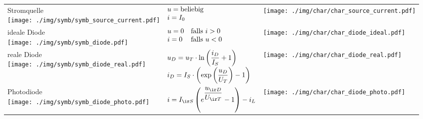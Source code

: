 \documentclass[fs, footer]{latex4ei}
\begin{document}
\begin{multicols*}{4}
\begin{tabular}{@{}p{1.1cm}p{2.9cm}l}
		\parbox{1.3cm}{ Stromquelle \\[3pt] \texttt{[image: ./img/symb/symb\_source\_current.pdf]} }& $\begin{array}{@{}ll} u = \mathrm{beliebig} \\ i = I_0 \end{array}$ & \parbox{1.8cm}{\texttt{[image: ./img/char/char\_source\_current.pdf]} }	\\ \mrule
		\parbox{1.3cm}{ ideale Diode \\[5pt] \texttt{[image: ./img/symb/symb\_diode.pdf]} }& $\begin{array}{@{}ll} u = 0 & \text{falls } i > 0 \\ i = 0 & \text{falls } u < 0\end{array}$ & \parbox{1.8cm}{\texttt{[image: ./img/char/char\_diode\_ideal.pdf]} } \\ \mrule
		\parbox{1.3cm}{ reale Diode \\[5pt] \texttt{[image: ./img/symb/symb\_diode\_real.pdf]} }& $\begin{array}{@{}ll} u_D = u_T \cdot \ln \left(\frac{i_D}{I_S} + 1 \right) \\[0.7em] i_D = I_S \cdot \left( \exp \left(\frac{u_D}{U_T}\right) -1 \right) \end{array}$ & \parbox{1.8cm}{\texttt{[image: ./img/char/char\_diode\_real.pdf]} } \\ \mrule
		\parbox{1.3cm}{ Photodiode \\ \texttt{[image: ./img/symb/symb\_diode\_photo.pdf]} }& $i = I_{\ir S} \left( e^{\frac{u_{\ir D}}{U_{\ir T}}} -1 \right) - i_L$ & \parbox{1.8cm}{\texttt{[image: ./img/char/char\_diode\_photo.pdf]} } \\
	\end{tabular}






\end{multicols*}
\end{document}
